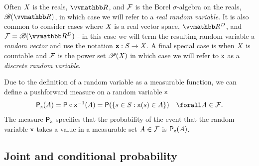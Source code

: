Often $\mathit{X}$ is the reals, $\reals$, and $\mathcal{F}$ is the Borel $\sigma$-algebra on the reals, $\borel(\reals)$, in which case we will refer to a \emph{real random variable}. It is also common to consider cases where $\mathit{X}$ is a real vector space, $\reals^D$, and $\sset{F} = \borel(\reals^D)$ - in this case we will term the resulting random variable a \emph{random vector} and use the notation $\boldsymbol{\mathsf{x}} : \mathit{S} \to \mathit{X}$. A final special case is when $\mathit{X}$ is countable and $\mathcal{F}$ is the power set $\mathscr{P}(\mathit{X})$ in which case we will refer to $\mathsf{x}$ as a \emph{discrete random variable}.

Due to the definition of a random variable as a measurable function, we can define a pushforward measure on a random variable $\mathsf{x}$
\begin{equation}
  \prob{\rvar{x}}(A) 
  = \probability\circ\rvar{x}^{-1}(\set{A})
  = \probability\lpa \lbr s \in \set{S}: \rvar{x}(s) \in A \rbr \rpa
  \quad \forall \set{A} \in \sset{F}.
\end{equation}
The measure $\mathsf{P}_{\mathsf{x}}$ specifies that the probability of the event that the random variable $\mathsf{x}$ takes a value in a measurable set $\mathit{A} \in \mathcal{F}$ is $\mathsf{P}_{\mathsf{x}}(\mathit{A})$.


\subsection{Joint and conditional probability}\label{subsec:joint-and-conditional-probabilities}


